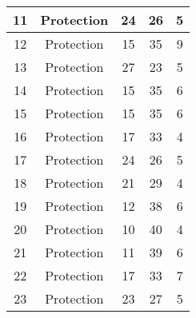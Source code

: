 \documentclass[results.tex]{subfiles}
\begin{document}
\begin{center}
\begin{tabular}{| c || c | c | c | c |}
            \hline
            11                      & Protection                   & 24                     & 26                      & 5                    \\
            \hline
            12                      & Protection                   & 15                     & 35                      & 9                    \\
            \hline
            13                      & Protection                   & 27                     & 23                      & 5                    \\
            \hline
            14                      & Protection                   & 15                     & 35                      & 6                    \\
            \hline
            15                      & Protection                   & 15                     & 35                      & 6                    \\
            \hline
            16                      & Protection                   & 17                     & 33                      & 4                    \\
            \hline
            17                      & Protection                   & 24                     & 26                      & 5                    \\
            \hline
            18                      & Protection                   & 21                     & 29                      & 4                    \\
            \hline
            19                      & Protection                   & 12                     & 38                      & 6                    \\
            \hline
            20                      & Protection                   & 10                     & 40                      & 4                    \\
            \hline
            21                      & Protection                   & 11                     & 39                      & 6                    \\
            \hline
            22                      & Protection                   & 17                     & 33                      & 7                    \\
            \hline
            23                      & Protection                   & 23                     & 27                      & 5                    \\

\end{tabular}
\end{center}
\end{document}
